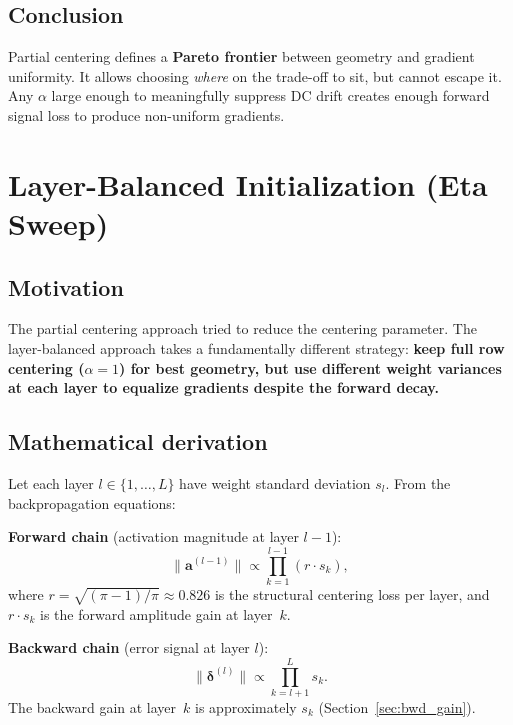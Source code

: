 \subsection{Conclusion}

Partial centering defines a \textbf{Pareto frontier} between geometry
and gradient uniformity.  It allows choosing \emph{where} on the
trade-off to sit, but cannot escape it.  Any $\alpha$ large enough to
meaningfully suppress DC drift creates enough forward signal loss to
produce non-uniform gradients.

\section{Layer-Balanced Initialization (Eta Sweep)}
\label{sec:eta_sweep}

\subsection{Motivation}

The partial centering approach tried to reduce the centering
parameter.  The layer-balanced approach takes a fundamentally different
strategy: \textbf{keep full row centering ($\alpha = 1$) for best
geometry, but use different weight variances at each layer to equalize
gradients despite the forward decay.}

\subsection{Mathematical derivation}

Let each layer $l \in \{1,\dots,L\}$ have weight standard deviation
$s_l$.  From the backpropagation equations:

\textbf{Forward chain} (activation magnitude at layer $l-1$):
\begin{equation}\label{eq:fwd_chain}
  \|\bm{a}^{(l-1)}\| \propto \prod_{k=1}^{l-1} (r \cdot s_k),
\end{equation}
where $r = \sqrt{(\pi-1)/\pi} \approx 0.826$ is the structural
centering loss per layer, and $r \cdot s_k$ is the forward amplitude
gain at layer~$k$.

\textbf{Backward chain} (error signal at layer $l$):
\begin{equation}\label{eq:bwd_chain}
  \|\bm{\delta}^{(l)}\| \propto \prod_{k=l+1}^{L} s_k.
\end{equation}
The backward gain at layer~$k$ is approximately $s_k$ (Section~\ref{sec:bwd_gain}).

